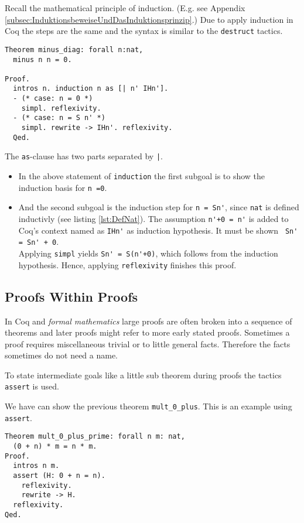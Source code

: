 Recall the mathematical principle of induction. (E.g. see Appendix \ref{subsec:InduktionsbeweiseUndDasInduktionsprinzip}.)
Due to apply induction in Coq the steps are the same and the syntax is similar to the \lstinline!destruct! tactics.
 

\begin{lstlisting}[caption = \lstinline!minus_diag!, label =lst:minus_diag] 
Theorem minus_diag: forall n:nat,
  minus n n = 0.
  
Proof.
  intros n. induction n as [| n' IHn'].
  - (* case: n = 0 *)
    simpl. reflexivity.
  - (* case: n = S n' *)
    simpl. rewrite -> IHn'. reflexivity.  
  Qed.
\end{lstlisting}

The \lstinline!as!-clause has two parts separated by \lstinline!|!.
\begin{itemize}
	\item In the above statement of \lstinline!induction! the first subgoal is to show the induction basis for \lstinline!n =0!.
	\item And the second subgoal is the induction step for \lstinline!n = Sn'!, since \lstinline!nat! is defined inductivly (see listing  \ref{lst:DefNat}).
	      The assumption \lstinline!n'+0 = n'! is added to Coq's context named as \lstinline!IHn'! as induction hypothesis.
		  It must be shown \lstinline! Sn' = Sn' + 0!. \\
          Applying \lstinline!simpl! yields \lstinline!Sn' = S(n'+0)!, which follows from the induction hypothesis. 
          Hence, applying \lstinline!reflexivity! finishes this proof.
\end{itemize} 

\subsection{Proofs Within Proofs}

In Coq and {\itshape formal mathematics} large proofs are often broken into a sequence of theorems and later proofs might refer to more early stated proofs.
Sometimes a proof requires miscellaneous trivial or to little general facts. 
Therefore the facts sometimes do not need a name.

To state intermediate goals like a little sub theorem during proofs the tactics \lstinline!assert! is used.


\begin{example}
We have can show the previous theorem \lstinline!mult_0_plus!. 
This is an example using \lstinline!assert!. 

\begin{lstlisting}[caption = \lstinline!mult_0_plus'!, label = lst:mult_0_plus_prime]
Theorem mult_0_plus_prime: forall n m: nat,
  (0 + n) * m = n * m. 
Proof.
  intros n m.
  assert (H: 0 + n = n).  
  	reflexivity. 
  	rewrite -> H.
  reflexivity.  
Qed.
\end{lstlisting}
\end{example}


